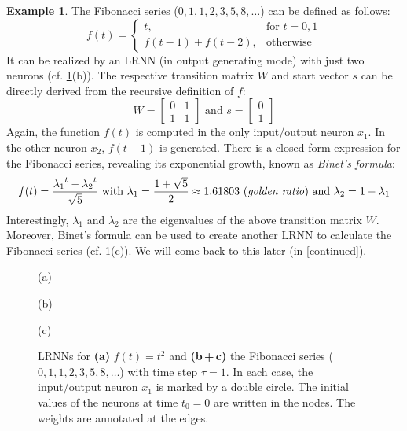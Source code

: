 \documentclass{sn-jnl}
\theoremstyle{definition}
\newtheorem{exmp}{Example}
\begin{document}
\begin{exmp}\label{fibonacci}
The Fibonacci series ($0,1,1,2,3,5,8,\dots$) can be defined as follows:
\[ f(t) = \left\{ \begin{array}{ll}
	t, & \text{for~} t=0,1\\
	f(t-1)+f(t-2), & \text{otherwise}
\end{array} \right. \]
It can be realized by an LRNN (in output generating mode) with just two neurons
(cf. \cref{examples}(b)). The respective transition matrix $W$ and start vector
$s$ can be directly derived from the recursive definition of $f$:
\[ W = \left[ \begin{array}{cc}
	0 & 1\\
	1 & 1
   \end{array} \right]
   \text{~and~} s = \left[ \begin{array}{c}
	0\\
	1
   \end{array} \right]
\]
Again, the function $f(t)$ is computed in the only input/output neuron $x_1$. In
the other neuron $x_2$, $f(t+1)$ is generated. There is a closed-form expression
for the Fibonacci series, revealing its exponential growth, known as
\emph{Binet's formula}:
\begin{equation}\label{binet}
   f(t) = \frac{{\lambda_1}^t-{\lambda_2}^t}{\sqrt{5}}
	\text{~with~} \lambda_1 = \displaystyle\frac{1+\sqrt{5}}{2} \approx 1.61803
	\text{~(\emph{golden ratio}) and~} \lambda_2 = 1-\lambda_1
\end{equation}
Interestingly, $\lambda_1$ and $\lambda_2$ are the eigenvalues of the above transition
matrix $W$. Moreover, Binet's formula can be used to create another LRNN to
calculate the Fibonacci series (cf. \cref{examples}(c)). We will come back to
this later (in \cref{continued}).
\end{exmp}

\begin{figure}
  \begin{minipage}[t]{0.32\textwidth}
  \vspace{0pt}
	(a) 
  \end{minipage}
	\hfill
  \begin{minipage}[t]{0.32\textwidth}
  \vspace{0pt}
  	(b) 
  \end{minipage}
	\hfill
  \begin{minipage}[t]{0.32\textwidth}
  \vspace{0pt}
	(c) 
  \end{minipage}
  \caption{LRNNs for \textbf{(a)} $f(t) = t^2$ and \textbf{(b\,+\,c)} the Fibonacci series
	($0,1,1,2,3,5,8,\dots$) with time step $\tau=1$. In each case, the input/output neuron
	$x_1$ is marked by a double circle. The initial values of the neurons at
	time $t_0=0$ are written in the nodes. The weights are annotated at the
	edges.}
  \label{examples}
\end{figure}
\end{document}
